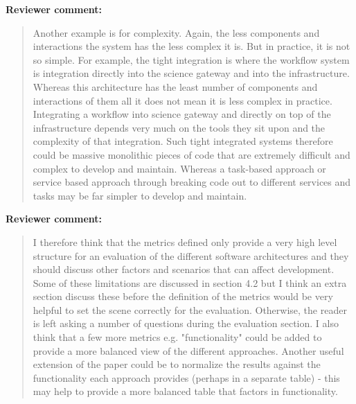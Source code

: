 \documentclass[a4]{letter}
\newenvironment{review}%
{\textbf{Reviewer comment:}\begin{quote}}%
{\end{quote}}%
\begin{document}
\begin{letter}{}
\begin{review}
Another example is for complexity.  Again, the less components and interactions the system has the less complex it is. But in practice, it is not so simple. For example, the tight integration is where the workflow system is integration directly into the science gateway and into the infrastructure. Whereas this architecture has the least number of components and interactions of them all it does not mean it is less complex in practice. Integrating a workflow into science gateway and directly on top of the infrastructure depends very much on the tools they sit upon and the complexity of that integration. Such tight integrated systems therefore could be massive monolithic pieces of code that are extremely difficult and complex to develop and maintain.  Whereas a task-based approach or service based approach through breaking code out to different services and tasks may be far simpler to develop and maintain. 
\end{review}

\begin{review}
I therefore think that the metrics defined only provide a very high level structure for an evaluation of the different software architectures and they should discuss other factors and scenarios that can affect development. Some of these limitations are discussed in section 4.2 but I think an extra section discuss these before the definition of the metrics would be very helpful to set the scene correctly for the evaluation. Otherwise, the reader is left asking a number of questions during the evaluation section. I also think that a few more metrics e.g. "functionality" could be added to provide a more balanced view of the different approaches. Another useful extension of the paper could be to normalize the results against the functionality each approach provides (perhaps in a separate table) - this may help to provide a more balanced table that factors in functionality.
\end{review}

\end{letter}
\end{document}
